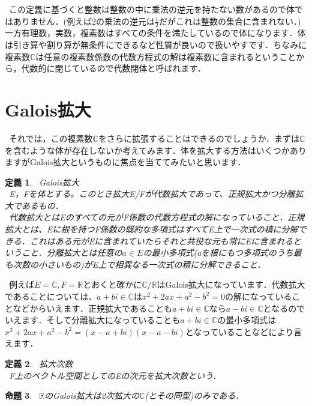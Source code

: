 \documentclass{jreport}
\theoremstyle{idefinition}
\newtheorem{idefi}{定義}[section]
\newtheorem{iprop}[idefi]{命題}
\begin{document}
\ この定義に基づくと整数は整数の中に乗法の逆元を持たない数があるので体ではありません．(例えば$2$の乗法の逆元は$\frac{1}{2}$だがこれは整数の集合に含まれない．)一方有理数，実数，複素数はすべての条件を満たしているので体になります．体は引き算や割り算が無条件にできるなど性質が良いので扱いやすです．ちなみに複素数$\mathbb{C}$は任意の複素数係数の代数方程式の解は複素数に含まれるということから，代数的に閉じているので代数閉体と呼ばれます．\\



\section{Galois拡大}
\ それでは，この複素数$\mathbb{C}$をさらに拡張することはできるのでしょうか．まずは$\mathbb{C}$を含むような体が存在しないか考えてみます．体を拡大する方法はいくつかありますがGalois拡大というものに焦点を当ててみたいと思います．\\

\begin{idefi}
\ Galois拡大\\
\ E，Fを体とする。このとき拡大E/Fが代数拡大であって、正規拡大かつ分離拡大であるもの．\\
\ 代数拡大とはEのすべての元がF係数の代数方程式の解になっていること．正規拡大とは、Eに根を持つF係数の既約な多項式はすべてE上で一次式の積に分解できる．これはある元がEに含まれていたらそれと共役な元も常にEに含まれるということ．分離拡大とは任意の$a \in E$の最小多項式(aを根にもつ多項式のうち最も次数の小さいもの)がE上で相異なる一次式の積に分解できること．
\end{idefi}

\ 例えば$E=\mathbb{C},F=\mathbb{R}$とおくと確かに$\mathbb{C}/\mathbb{R}$はGalois拡大になっています．代数拡大であることについては、$a+bi\in \mathbb{C}$は$x^2+2ax+a^2-b^2=0$の解になっていることなどからいえます．正規拡大であることも$a+bi\in \mathbb{C}$なら$a-bi\in \mathbb{C}$となるのでいえます．そして分離拡大になっていることも$a+bi\in \mathbb{C}$の最小多項式は$x^2+2ax+a^2-b^2=(x-a+bi)(x-a-bi)$となっていることなどにより言えます．\\


\begin{idefi}
\ 拡大次数\\
\ F上のベクトル空間としてのEの次元を拡大次数という．\\
\end{idefi}



\begin{iprop}
\ $\mathbb{R}$のGalois拡大は2次拡大の$\mathbb{C}$(とその同型)のみである．\\
\end{iprop}
\end{document}
